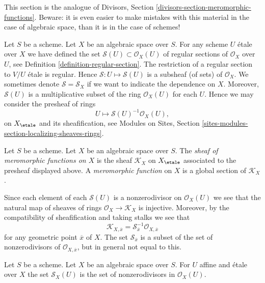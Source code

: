 \noindent
This section is the analogue of
Divisors, Section \ref{divisors-section-meromorphic-functions}.
Beware: it is even easier to make mistakes with this material in the
case of algebraic space, than it is in the case of schemes!

\medskip\noindent
Let $S$ be a scheme. Let $X$ be an algebraic space over $S$.
For any scheme $U$ \'etale over $X$ we have defined the set
$\mathcal{S}(U) \subset \mathcal{O}_X(U)$
of regular sections of $\mathcal{O}_X$ over $U$, see
Definition \ref{definition-regular-section}. The restriction
of a regular section to $V/U$ \'etale is regular. Hence
$\mathcal{S} : U \mapsto \mathcal{S}(U)$ is a subsheaf (of sets)
of $\mathcal{O}_X$. We sometimes denote $\mathcal{S} = \mathcal{S}_X$
if we want to indicate the dependence on $X$.
Moreover, $\mathcal{S}(U)$
is a multiplicative subset of the ring $\mathcal{O}_X(U)$ for
each $U$. Hence we may consider
the presheaf of rings
$$
U \longmapsto \mathcal{S}(U)^{-1} \mathcal{O}_X(U),
$$
on $X_\etale$ and its sheafification, see
Modules on Sites, Section \ref{sites-modules-section-localizing-sheaves-rings}.

\begin{definition}
\label{definition-sheaf-meromorphic-functions}
Let $S$ be a scheme. Let $X$ be an algebraic space over $S$.
The {\it sheaf of meromorphic functions on $X$} is
the sheaf {\it $\mathcal{K}_X$} on $X_\etale$ associated to the presheaf
displayed above. A {\it meromorphic function} on $X$
is a global section of $\mathcal{K}_X$.
\end{definition}

\noindent
Since each element of each $\mathcal{S}(U)$ is a nonzerodivisor on
$\mathcal{O}_X(U)$ we see that the natural map of sheaves
of rings $\mathcal{O}_X \to \mathcal{K}_X$ is injective.
Moreover, by the compatibility of sheafification and taking stalks
we see that
$$
\mathcal{K}_{X, \overline{x}} =
\mathcal{S}_{\overline{x}}^{-1}\mathcal{O}_{X, \overline{x}}
$$
for any geometric point $\overline{x}$ of $X$. The set
$\mathcal{S}_{\overline{x}}$ is a subset of
the set of nonzerodivisors of $\mathcal{O}_{X, \overline{x}}$, but
in general not equal to this.

\begin{lemma}
\label{lemma-describe-S}
Let $S$ be a scheme. Let $X$ be an algebraic space over $S$.
For $U$ affine and \'etale over $X$ the set
$\mathcal{S}_X(U)$ is the set of nonzerodivisors in
$\mathcal{O}_X(U)$.
\end{lemma}

